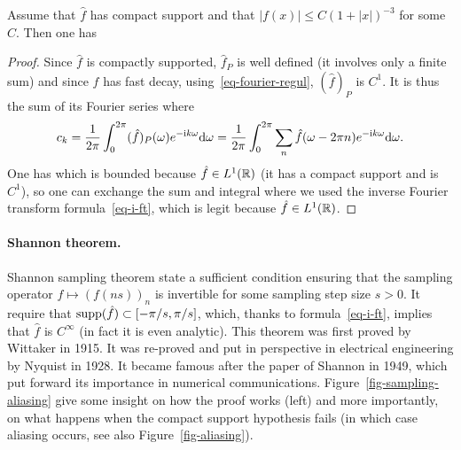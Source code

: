 \begin{prop}\label{prop-poisson}
Assume that $\hat f$ has compact support and that $|f(x)| \leq C(1+|x|)^{-3}$ for some $C$. Then one has 
\end{prop}
\begin{proof}
	Since $\hat f$ is compactly supported, $\hat f_P$ is well defined (it involves only a finite sum) and since $f$ has fast decay, using~\eqref{eq-fourier-regul}, $(\hat f)_P$ is $C^1$. It is thus the sum of its Fourier series
	where
	\begin{align*}
		c_k = \frac{1}{2\pi} \int_0^{2\pi} (\hat f)_P(\omega) e^{-\mathrm{i} k \omega} \mathrm{d} \omega = 
		\frac{1}{2\pi} \int_0^{2\pi} \sum_n \hat f(\omega-2\pi n) e^{-\mathrm{i} k \omega}  \mathrm{d} \omega .
	\end{align*}
	One has 
	which is bounded because $\hat f \in L^1(\mathbb{R})$ (it has a compact support and is $C^1$), so one can exchange the sum and integral
	where we used the inverse Fourier transform formula~\eqref{eq-i-ft}, which is legit because $\hat f \in L^1(\mathbb{R})$.
\end{proof}

\paragraph{Shannon theorem.}

Shannon sampling theorem state a sufficient condition ensuring that the sampling operator $f \mapsto (f(ns))_n$ is invertible for some sampling step size $s>0$. 
%
It require that $\operatorname{supp}(\hat f) \subset [-\pi/s,\pi/s]$, which, thanks to formula~\eqref{eq-i-ft}, implies that $\hat f$ is $C^\infty$ (in fact it is even analytic). 
%
This theorem was first proved by Wittaker in 1915. It was re-proved and put in perspective in electrical engineering by Nyquist in 1928. It became famous after the paper of Shannon in 1949, which put forward its importance in numerical communications.
%
Figure~\ref{fig-sampling-aliasing} give some insight on how the proof works (left) and more importantly, on what happens when the compact support hypothesis fails (in which case aliasing occurs, see also Figure~\ref{fig-aliasing}). 

